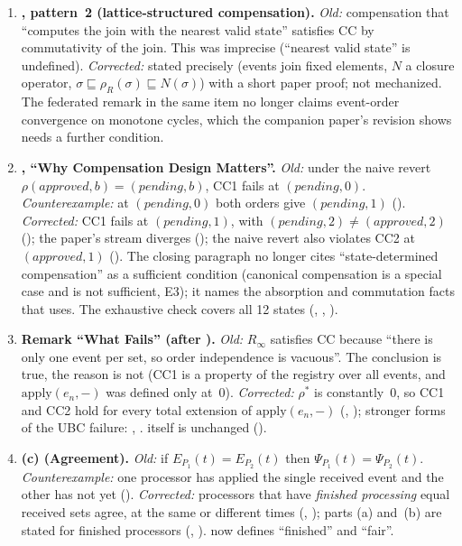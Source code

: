 \documentclass[11pt,a4paper]{article}
\theoremstyle{plain}
\theoremstyle{definition}
\theoremstyle{remark}
\begin{document}
\begin{enumerate}[leftmargin=*,label=\textbf{E\arabic*.},ref=E\arabic*]
\item \textbf{, pattern~2 (lattice-structured
  compensation).}
  \emph{Old:} compensation that ``computes the join with the nearest valid
  state'' satisfies CC by commutativity of the join.  This was imprecise
  (``nearest valid state'' is undefined).
  \emph{Corrected:} stated precisely (events join fixed elements, $N$ a
  closure operator, $\sigma \sqsubseteq \rho_R(\sigma) \sqsubseteq N(\sigma)$)
  with a short paper proof; not mechanized.  The federated remark in the same
  item no longer claims event-order convergence on monotone cycles, which the
  companion paper's revision shows needs a further condition.

\item \textbf{, ``Why Compensation Design Matters''.}
  \emph{Old:} under the naive revert $\rho(\textit{approved}, b) =
  (\textit{pending}, b)$, CC1 fails at $(\textit{pending}, 0)$.
  \emph{Counterexample:} at $(\textit{pending}, 0)$ both orders give
  $(\textit{pending}, 1)$ ().
  \emph{Corrected:} CC1 fails at $(\textit{pending}, 1)$, with
  $(\textit{pending}, 2) \neq (\textit{approved}, 2)$
  (); the paper's stream diverges
  (); the naive revert also violates CC2 at
  $(\textit{approved}, 1)$ ().  The closing paragraph
  no longer cites ``state-determined compensation'' as a sufficient
  condition (canonical compensation is a special case and is not sufficient,
  E3); it names the absorption and commutation facts that
   uses.  The exhaustive check covers all 12 states
  (, , ).

\item \textbf{Remark ``What Fails'' (after ).}
  \emph{Old:} $R_\infty$ satisfies CC because ``there is only one event per
  set, so order independence is vacuous''.  The conclusion is true, the
  reason is not (CC1 is a property of the registry over all events, and
  $\mathrm{apply}(e_n, -)$ was defined only at~0).
  \emph{Corrected:} $\rho^*$ is constantly~0, so CC1 and CC2 hold for every
  total extension of $\mathrm{apply}(e_n, -)$ (,
  ); stronger forms of the UBC failure:
  , .   itself is
  unchanged ().

\item \textbf{(c) (Agreement).}
  \emph{Old:} if $E_{P_1}(t) = E_{P_2}(t)$ then $\Psi_{P_1}(t) =
  \Psi_{P_2}(t)$.
  \emph{Counterexample:} one processor has applied the single received event
  and the other has not yet ().
  \emph{Corrected:} processors that have \emph{finished processing} equal
  received sets agree, at the same or different times
  (, ); parts (a) and~(b)
  are stated for finished processors (,
  ).   now defines
  ``finished'' and ``fair''.


\end{enumerate}
\end{document}

